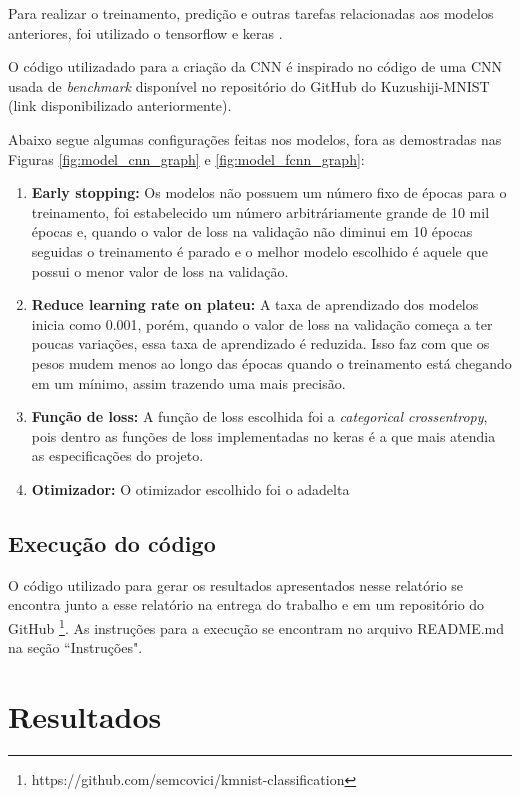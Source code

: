 \documentclass[12pt]{article}
\begin{document}
Para realizar o treinamento, predição e outras tarefas relacionadas aos modelos anteriores, foi utilizado o tensorflow \cite{tensorflow2015-whitepaper} e keras \cite{chollet2015keras}.

O código utilizadado para a criação da CNN é inspirado no código de uma CNN usada de \textit{benchmark} disponível no repositório do GitHub do Kuzushiji-MNIST (link disponibilizado anteriormente).

Abaixo segue algumas configurações feitas nos modelos, fora as demostradas nas Figuras \ref{fig:model_cnn_graph} e \ref{fig:model_fcnn_graph}:

\begin{enumerate}
  \item \textbf{Early stopping:} Os modelos não possuem um número fixo de épocas para o treinamento, foi estabelecido um número arbitráriamente grande de 10 mil épocas e, quando o valor de loss na validação não diminui em 10 épocas seguidas o treinamento é parado e o melhor modelo escolhido é aquele que possui o menor valor de loss na validação. 
  \item \textbf{Reduce learning rate on plateu:} A taxa de aprendizado dos modelos inicia como 0.001, porém, quando o valor de loss na validação começa a ter poucas variações, essa taxa de aprendizado é reduzida. Isso faz com que os pesos mudem menos ao longo das épocas quando o treinamento está chegando em um mínimo, assim trazendo uma mais precisão. 
  \item \textbf{Função de loss:} A função de loss escolhida foi a \textit{categorical crossentropy}, pois dentro as funções de loss implementadas no keras é a que mais atendia as especificações do projeto.
  \item \textbf{Otimizador:} O otimizador escolhido foi o adadelta
\end{enumerate}


\subsection{Execução do código}

O código utilizado para gerar os resultados apresentados nesse relatório se encontra junto a esse relatório na entrega do trabalho e em um repositório do GitHub \footnote{https://github.com/semcovici/kmnist-classification}. As instruções para a execução se encontram no arquivo README.md na seção ``Instruções".

\section{Resultados}
\end{document}

